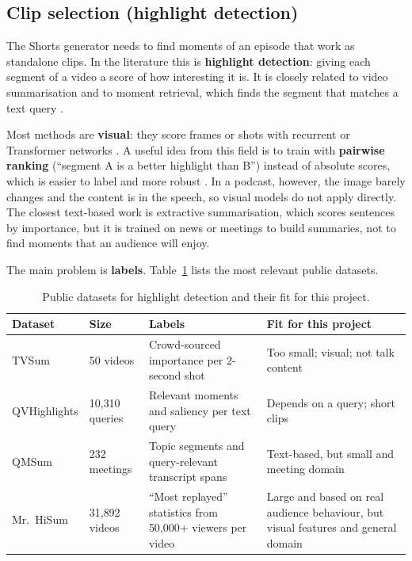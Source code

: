 \documentclass[ENG]{TFUOC}
\begin{document}
\subsection{Clip selection (highlight detection)}
\label{ss:soa-highlights}

The Shorts generator needs to find moments of an episode that work as standalone clips. In the literature this is \textbf{highlight detection}: giving each segment of a video a score of how interesting it is. It is closely related to video summarisation \cite{apostolidis2021survey} and to moment retrieval, which finds the segment that matches a text query \cite{lei2021qvhighlights}.

Most methods are \textbf{visual}: they score frames or shots with recurrent or Transformer networks \cite{apostolidis2021survey}. A useful idea from this field is to train with \textbf{pairwise ranking} (``segment A is a better highlight than B'') instead of absolute scores, which is easier to label and more robust \cite{yao2016pairwise}. In a podcast, however, the image barely changes and the content is in the speech, so visual models do not apply directly. The closest text-based work is extractive summarisation, which scores sentences by importance, but it is trained on news or meetings to build summaries, not to find moments that an audience will enjoy.

The main problem is \textbf{labels}. Table~\ref{tab:highlight-datasets} lists the most relevant public datasets.

\begin{table}[H]
\centering
\caption{Public datasets for highlight detection and their fit for this project.}
\label{tab:highlight-datasets}
\small
\begin{tabular}{@{}p{2.6cm}p{2.8cm}p{4.8cm}p{5.3cm}@{}}
\toprule
\textbf{Dataset} & \textbf{Size} & \textbf{Labels} & \textbf{Fit for this project} \\
\midrule
TVSum \cite{song2015tvsum} & 50 videos & Crowd-sourced importance per 2-second shot & Too small; visual; not talk content \\
QVHighlights \cite{lei2021qvhighlights} & 10{,}310 queries & Relevant moments and saliency per text query & Depends on a query; short clips \\
QMSum \cite{zhong2021qmsum} & 232 meetings & Topic segments and query-relevant transcript spans & Text-based, but small and meeting domain \\
Mr.~HiSum \cite{sul2023mrhisum} & 31{,}892 videos & ``Most replayed'' statistics from 50{,}000+ viewers per video & Large and based on real audience behaviour, but visual features and general domain \\
\bottomrule
\end{tabular}
\end{table}
\end{document}
